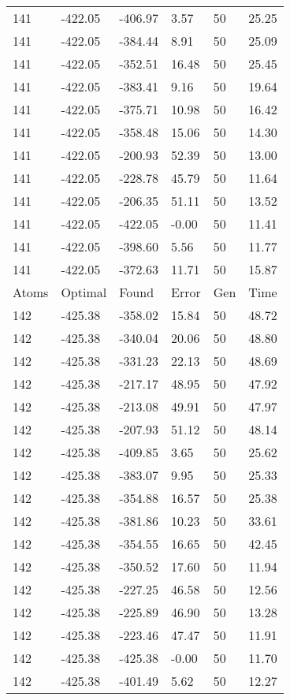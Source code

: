\documentclass{report}
\begin{document}
\begin{appendix}
\begin{longtable}{llllll}
141 & -422.05 & -406.97 & 3.57 & 50 & 25.25 \\
141 & -422.05 & -384.44 & 8.91 & 50 & 25.09 \\
141 & -422.05 & -352.51 & 16.48 & 50 & 25.45 \\
141 & -422.05 & -383.41 & 9.16 & 50 & 19.64 \\
141 & -422.05 & -375.71 & 10.98 & 50 & 16.42 \\
141 & -422.05 & -358.48 & 15.06 & 50 & 14.30 \\
141 & -422.05 & -200.93 & 52.39 & 50 & 13.00 \\
141 & -422.05 & -228.78 & 45.79 & 50 & 11.64 \\
141 & -422.05 & -206.35 & 51.11 & 50 & 13.52 \\
141 & -422.05 & -422.05 & -0.00 & 50 & 11.41 \\
141 & -422.05 & -398.60 & 5.56 & 50 & 11.77 \\
141 & -422.05 & -372.63 & 11.71 & 50 & 15.87 \\
Atoms & Optimal & Found & Error & Gen & Time \\
142 & -425.38 & -358.02 & 15.84 & 50 & 48.72 \\
142 & -425.38 & -340.04 & 20.06 & 50 & 48.80 \\
142 & -425.38 & -331.23 & 22.13 & 50 & 48.69 \\
142 & -425.38 & -217.17 & 48.95 & 50 & 47.92 \\
142 & -425.38 & -213.08 & 49.91 & 50 & 47.97 \\
142 & -425.38 & -207.93 & 51.12 & 50 & 48.14 \\
142 & -425.38 & -409.85 & 3.65 & 50 & 25.62 \\
142 & -425.38 & -383.07 & 9.95 & 50 & 25.33 \\
142 & -425.38 & -354.88 & 16.57 & 50 & 25.38 \\
142 & -425.38 & -381.86 & 10.23 & 50 & 33.61 \\
142 & -425.38 & -354.55 & 16.65 & 50 & 42.45 \\
142 & -425.38 & -350.52 & 17.60 & 50 & 11.94 \\
142 & -425.38 & -227.25 & 46.58 & 50 & 12.56 \\
142 & -425.38 & -225.89 & 46.90 & 50 & 13.28 \\
142 & -425.38 & -223.46 & 47.47 & 50 & 11.91 \\
142 & -425.38 & -425.38 & -0.00 & 50 & 11.70 \\
142 & -425.38 & -401.49 & 5.62 & 50 & 12.27 \\

\end{longtable}
\end{appendix}
\end{document}

